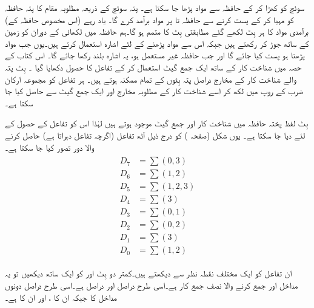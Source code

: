 سوئچ  کو کھڑا کر کے حافظہ سے مواد پڑھا جا سکتا ہے۔  پتہ سوئچ  کے ذریعہ  مطلوبہ مقام کا پتہ حافظہ کو مہیا کر کے      پست کرنے سے حافظہ    تا   پر  مواد  برآمد کرے گا۔ یاد رہے (اس مخصوص حافظہ کے)  برآمدی مواد  کا ہر بِٹ لکھے گئے  مطابقتی  بِٹ کا متمم ہو گا۔ہم   حافظہ میں  لکھائی کے دوران  کو زمین کے ساتھ جوڑ کر رکھتے ہیں   جبکہ اس سے مواد پڑھنے کے لئے  اشارہ  استعمال کرتے ہیں۔یوں  جب مواد پڑھنا ہو   پست کیا جائے گا اور جب حافظہ غیر مستعمل ہو، یہ اشارہ بلند رکھا جائے گا۔
اس کتاب کے حصہ  میں شناخت کار کے ساتھ ایک جمع گیٹ استعمال کر کے تفاعل کا حصول دکھایا گیا ۔  بِٹ پتہ والے شناخت کار کے  مخارج دراصل پتہ بِٹوں کے تمام ممکنہ  ہوتے ہیں۔ ہر تفاعل کو مجموعہ ارکان ضرب کے روپ میں لکھ کر اسے شناخت کار کے مطلوبہ مخارج اور ایک جمع گیٹ سے حاصل کیا جا سکتا ہے۔ 

 بِٹ لفظ پختہ حافظہ میں شناخت کار اور  جمع گیٹ موجود ہوتے ہیں لہٰذا اس کو  تفاعل کے حصول کے لئے  دیا جا سکتا ہے۔ یوں شکل    (صفحہ ) کو درج ذیل آٹھ تفاعل (اگرچہ  تفاعل  دہراتا ہے) حاصل کرنے والا دور تصور کیا جا سکتا ہے۔
\begin{gather}
\begin{aligned}
D_7&=\sum (0,3)\\
D_6&=\sum(1,2)\\
D_5&=\sum (1,2,3)\\
D_4&=\sum(3)\\
D_3&=\sum(0,1)\\
D_2&=\sum (0,2)\\
D_1&=\sum(3)\\
D_0&=\sum(1,2)
\end{aligned}
\end{gather}

ان تفاعل کو ایک مختلف نقطہ نظر سے دیکھتے ہیں۔کمتر دو بِٹ  اور  کو ایک ساتھ  دیکھیں تو یہ مداخل  اور  جمع کرنے والا نصف جمع کار ہے۔اسی طرح  دراصل  اور  دراصل  ہے۔اسی طرح  دراصل دونوں مداخل کا  جبکہ  ان کا ،   اور  ان کا ہے۔

